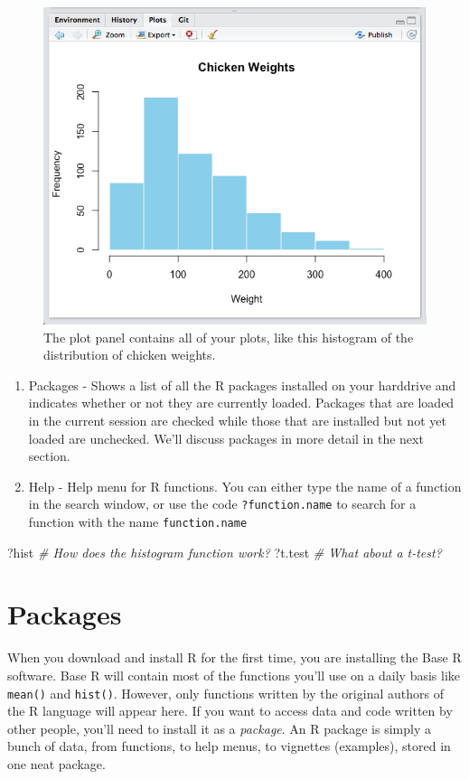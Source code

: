 \documentclass[]{book}
\newenvironment{Shaded}{\begin{snugshade}}{\end{snugshade}}
\newcommand{\CommentTok}[1]{\textcolor[rgb]{0.56,0.35,0.01}{\textit{#1}}}
\newcommand{\NormalTok}[1]{#1}
\theoremstyle{definition}
\theoremstyle{definition}
\theoremstyle{remark}
\begin{document}
\begin{figure}
\includegraphics[width=0.75\linewidth]{images/plotpanelss} \caption{The plot panel contains all of your plots, like this histogram of the distribution of chicken weights.}\label{fig:plotpanel}
\end{figure}

\begin{enumerate}
\def\labelenumi{\arabic{enumi}.}
\setcounter{enumi}{2}
\item
  Packages - Shows a list of all the R packages installed on your
  harddrive and indicates whether or not they are currently loaded.
  Packages that are loaded in the current session are checked while
  those that are installed but not yet loaded are unchecked. We'll
  discuss packages in more detail in the next section.
\item
  Help - Help menu for R functions. You can either type the name of a
  function in the search window, or use the code \texttt{?function.name}
  to search for a function with the name \texttt{function.name}
\end{enumerate}

\begin{Shaded}
\begin{Highlighting}[]
\NormalTok{?hist   }\CommentTok{# How does the histogram function work?}
\NormalTok{?t.test }\CommentTok{# What about a t-test?}
\end{Highlighting}
\end{Shaded}

\section{Packages}\label{packages}

When you download and install R for the first time, you are installing
the Base R software. Base R will contain most of the functions you'll
use on a daily basis like \texttt{mean()} and \texttt{hist()}. However,
only functions written by the original authors of the R language will
appear here. If you want to access data and code written by other
people, you'll need to install it as a \emph{package}. An R package is
simply a bunch of data, from functions, to help menus, to vignettes
(examples), stored in one neat package.
\end{document}
